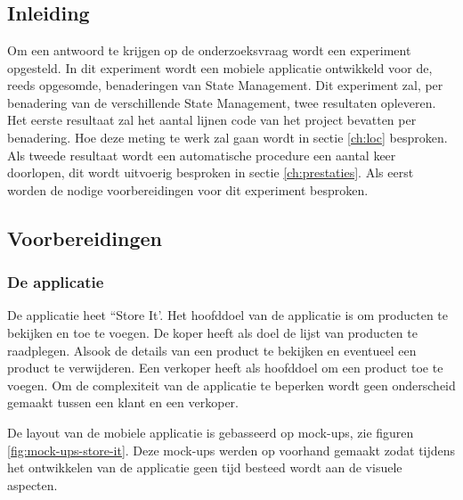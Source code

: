 
\chapter{}
\label{ch:methodologie}

\section{Inleiding}
Om een antwoord te krijgen op de onderzoeksvraag wordt een experiment opgesteld. In dit experiment wordt een mobiele applicatie ontwikkeld voor de, reeds opgesomde, benaderingen van State Management. Dit experiment zal, per benadering van de verschillende State Management, twee resultaten opleveren. Het eerste resultaat zal het aantal lijnen code van het project bevatten per benadering. Hoe deze meting te werk zal gaan wordt in sectie \ref{ch:loc} besproken. Als tweede resultaat wordt een automatische procedure een aantal keer doorlopen, dit wordt uitvoerig besproken in sectie \ref{ch:prestaties}. \newline
Als eerst worden de nodige voorbereidingen voor dit experiment besproken.

\section{Voorbereidingen}
\subsection{De applicatie}
De applicatie heet ``Store It'. Het hoofddoel van de applicatie is om producten te bekijken en toe te voegen. De koper heeft als doel de lijst van producten te raadplegen. Alsook de details van een product te bekijken en eventueel een product te verwijderen. Een verkoper heeft als hoofddoel om een product toe te voegen. Om de complexiteit van de applicatie te beperken wordt geen onderscheid gemaakt tussen een klant en een verkoper.\newline

De layout van de mobiele applicatie is gebasseerd op mock-ups, zie figuren \ref{fig:mock-ups-store-it}. Deze mock-ups werden op voorhand gemaakt zodat tijdens het ontwikkelen van de applicatie geen tijd besteed wordt aan de visuele aspecten.

